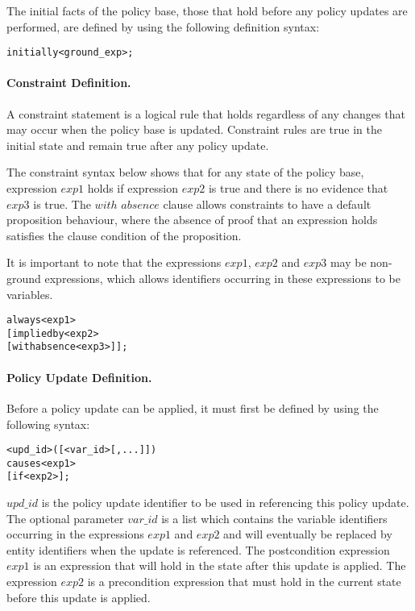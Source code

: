 \documentclass[global,twocolumn,final]{svjour}
\newenvironment{vverbatim}
  {\begin{alltt}}
  {\vspace{-\baselineskip}\end{alltt}}
\begin{document}
          The initial facts of the policy base, those that hold before any
          policy updates are performed, are defined by using the following
          definition syntax:

          \begin{vverbatim}
  initially <ground\_exp>;
          \end{vverbatim}

        \paragraph{Constraint Definition.}

          A constraint statement is a logical rule that holds regardless of any
          changes that may occur when the policy base is updated. Constraint
          rules are true in the initial state and remain true after any policy
          update.

          The constraint syntax below shows that for any state of the policy
          base, expression $exp1$ holds if expression $exp2$ is true and there
          is no evidence that $exp3$ is true. The $with$ $absence$ clause
          allows constraints to have a default proposition behaviour, where
          the absence of proof that an expression holds  satisfies the clause
          condition of the proposition.

          It is important to note that the expressions $exp1$, $exp2$ and
          $exp3$ may be non-ground expressions, which allows identifiers
          occurring in these expressions to be variables.

          \begin{vverbatim}
  always <exp1>
    [implied by <exp2>
    [with absence <exp3>]];
          \end{vverbatim}

        \paragraph{Policy Update Definition.}

          Before a policy update can be applied, it must first be defined by
          using the following syntax:

          \begin{vverbatim}
  <upd\_id>([<var\_id>[, ...]])
    causes <exp1>
    [if <exp2>];
          \end{vverbatim}

          $upd\_id$ is the policy update identifier to be used in referencing
          this policy update. The optional parameter $var\_id$ is a list which
          contains the variable identifiers occurring in the expressions $exp1$
          and $exp2$ and will eventually be replaced by entity identifiers when
          the update is referenced. The postcondition expression $exp1$ is an
          expression that will hold in the state after this update is applied.
          The expression $exp2$ is a precondition expression that must hold in
          the current state before this update is applied.
\end{document}
